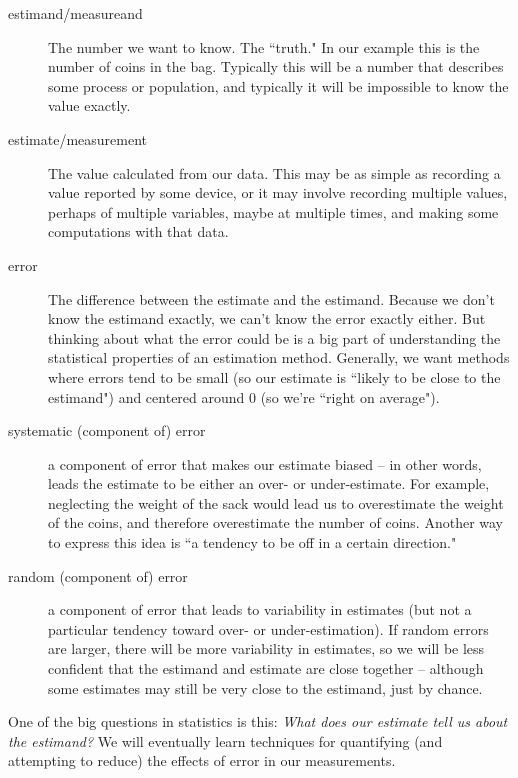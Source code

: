 \documentclass[twoside]{book}\usepackage[]{graphicx}\usepackage[]{xcolor}
\newcounter{example}[section]
\begin{document}
\begin{description}
	\item[estimand/measureand]{ The number we want to know.  The ``truth." 
    In our example this is the number
		of coins in the bag.  Typically this will be a number that describes some process
		or population, and typically it will be impossible to know the value exactly.}

	\item[estimate/measurement]{The value calculated from our data.  This may be 
		as simple as recording a value reported by some device, or it may involve
		recording multiple values, perhaps of multiple variables, maybe at multiple times,
    and making some computations with that data.}  

	\item[error]{The difference between the estimate and the estimand.  Because we don't
		know the estimand exactly, we can't know the error exactly either.  But thinking
		about what the error could be is a big part of understanding the statistical
		properties of an estimation method.  Generally, we want methods where errors 
		tend to be small (so our estimate is ``likely to be close to the estimand")
		and centered around 0 (so we're ``right on average").}
	\item
		[systematic (component of) error]{a component of error that makes our estimate
    biased -- in other words, leads the estimate to be either an over- or under-estimate.
    For example, neglecting the weight of the sack would
		lead us to overestimate the weight of the coins, and therefore overestimate 
		the number of coins.  Another way to express this idea is ``a tendency to be off in
		a certain direction."}
	\item
		[random (component of) error]{a component of error that leads to variability
		in estimates (but not a particular tendency toward over- or under-estimation).
    If random errors are larger, there will be more variability 
		in estimates, so we will be less confident that the estimand and estimate are 
		close together -- although some estimates may still be very close to the estimand,
    just by chance.}
\end{description}

One of the big questions in statistics is this:  
\emph{What does our estimate tell us about the estimand?}
We will eventually learn techniques for quantifying (and attempting to reduce)
the effects of error in our measurements. 
\end{document}
